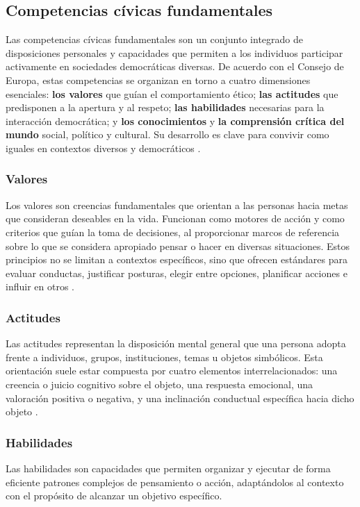 \subsection{Competencias cívicas fundamentales}
Las competencias cívicas fundamentales son un conjunto integrado de
disposiciones personales y capacidades que permiten a los individuos participar
activamente en sociedades democráticas diversas. De acuerdo con el Consejo de
Europa, estas competencias se organizan en torno a cuatro dimensiones
esenciales: \textbf{los valores} que guían el comportamiento ético; \textbf{las
    actitudes} que predisponen a la apertura y al respeto; \textbf{las habilidades}
necesarias para la interacción democrática; y \textbf{los conocimientos} y
\textbf{la comprensión crítica del mundo} social, político y cultural. Su
desarrollo es clave para convivir como iguales en contextos diversos y
democráticos \cite{barrett2016competences}.

\subsubsection{Valores}
Los valores son creencias fundamentales que orientan a las personas hacia metas
que consideran deseables en la vida. Funcionan como motores de acción y como
criterios que guían la toma de decisiones, al proporcionar marcos de referencia
sobre lo que se considera apropiado pensar o hacer en diversas situaciones.
Estos principios no se limitan a contextos específicos, sino que ofrecen
estándares para evaluar conductas, justificar posturas, elegir entre opciones,
planificar acciones e influir en otros \cite{barrett2016competences}.

\subsubsection{Actitudes}
Las actitudes representan la disposición mental general que una persona adopta
frente a individuos, grupos, instituciones, temas u objetos simbólicos. Esta
orientación suele estar compuesta por cuatro elementos interrelacionados: una
creencia o juicio cognitivo sobre el objeto, una respuesta emocional, una
valoración positiva o negativa, y una inclinación conductual específica hacia
dicho objeto \cite{barrett2016competences}.

\subsubsection{Habilidades}
Las habilidades son capacidades que permiten organizar y ejecutar de forma
eficiente patrones complejos de pensamiento o acción, adaptándolos al contexto
con el propósito de alcanzar un objetivo específico.
\cite{barrett2016competences}

